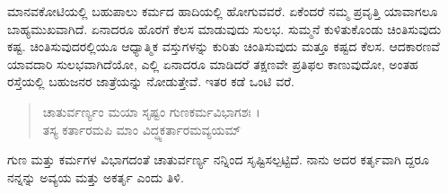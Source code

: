 ಮಾನವಕೋಟಿಯಲ್ಲಿ ಬಹುಪಾಲು ಕರ್ಮದ ಹಾದಿಯಲ್ಲಿ ಹೋಗುವವರೆ. ಏಕೆಂದರೆ ನಮ್ಮ ಪ್ರವೃತ್ತಿ ಯಾವಾಗಲೂ ಬಾಹ್ಯಮುಖವಾಗಿದೆ. ಏನಾದರೂ ಹೊರಗೆ ಕೆಲಸ ಮಾಡುವುದು ಸುಲಭ. ಸುಮ್ಮನೆ ಕುಳಿತುಕೊಂಡು ಚಿಂತಿಸುವುದು ಕಷ್ಟ. ಚಿಂತಿಸುವುದರಲ್ಲಿಯೂ ಆಧ್ಯಾತ್ಮಿಕ ವಸ್ತುಗಳನ್ನು ಕುರಿತು ಚಿಂತಿಸುವುದು ಮತ್ತೂ ಕಷ್ಟದ ಕೆಲಸ. ಆದಕಾರಣವೆ ಯಾವದಾರಿ ಸುಲಭವಾಗಿದೆಯೋ, ಎಲ್ಲಿ ಏನಾದರೂ ಮಾಡಿದರೆ ತಕ್ಷಣವೇ ಪ್ರತಿಫಲ ಕಾಣುವುದೋ, ಅಂತಹ ರಸ್ತೆಯಲ್ಲಿ ಬಹುಜನರ ಜಾತ್ರೆಯನ್ನು ನೋಡುತ್ತೇವೆ. ಇತರ ಕಡೆ ಒಂಟಿ ವರೆ.

\begin{verse}
ಚಾತುರ್ವರ್ಣ್ಯಂ ಮಯಾ ಸೃಷ್ಟಂ ಗುಣಕರ್ಮವಿಭಾಗಶಃ ।\\ತಸ್ಯ ಕರ್ತಾರಮಪಿ ಮಾಂ ವಿದ್ಧ್ಯಕರ್ತಾರಮವ್ಯಯಮ್ 
\end{verse}

{\small ಗುಣ ಮತ್ತು ಕರ್ಮಗಳ ವಿಭಾಗದಂತೆ ಚಾತುರ್ವರ್ಣ್ಯ ನನ್ನಿಂದ ಸೃಷ್ಟಿಸಲ್ಪಟ್ಟಿದೆ. ನಾನು ಅದರ ಕರ್ತೃವಾಗಿ ದ್ದರೂ ನನ್ನನ್ನು ಅವ್ಯಯ ಮತ್ತು ಅಕರ್ತೃ ಎಂದು ತಿಳಿ.}

